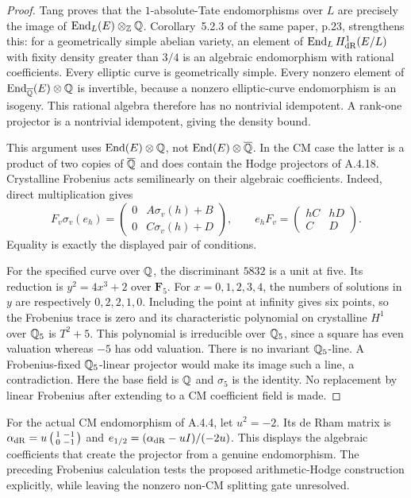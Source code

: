 \begin{proof}
Tang \cite[Definition 2.3.1 and Theorem 2.3.3, p.7]{EllTang2017} proves that the $1$-absolute-Tate endomorphisms over $L$ are precisely the image of
$\operatorname{End}_L(E)\otimes_{\mathbb Z}\mathbb Q$. Corollary~5.2.3 of the same paper, p.23, strengthens this: for a geometrically simple abelian variety, an element of $\operatorname{End}_L H^1_{\mathrm{dR}}(E/L)$ with fixity density greater than $3/4$ is an algebraic endomorphism with rational coefficients. Every elliptic curve is geometrically simple. Every nonzero element of $\operatorname{End}_{\overline{\mathbb Q}}(E)\otimes\mathbb Q$ is invertible, because a nonzero elliptic-curve endomorphism is an isogeny. This rational algebra therefore has no nontrivial idempotent. A rank-one projector is a nontrivial idempotent, giving the density bound.

This argument uses $\operatorname{End}(E)\otimes\mathbb Q$, not $\operatorname{End}(E)\otimes\overline{\mathbb Q}$. In the CM case the latter is a product of two copies of $\overline{\mathbb Q}$ and does contain the Hodge projectors of A.4.18. Crystalline Frobenius acts semilinearly on their algebraic coefficients. Indeed, direct multiplication gives
\[
 F_v\sigma_v(e_h)=
 \begin{pmatrix}0&A\sigma_v(h)+B\\0&C\sigma_v(h)+D\end{pmatrix},
 \qquad
 e_hF_v=\begin{pmatrix}hC&hD\\C&D\end{pmatrix}.
\]
Equality is exactly the displayed pair of conditions.

For the specified curve over $\mathbb Q$, the discriminant $5832$ is a unit at five. Its reduction is $y^2=4x^3+2$ over $\mathbf F_5$. For $x=0,1,2,3,4$, the numbers of solutions in $y$ are respectively $0,2,2,1,0$. Including the point at infinity gives six points, so the Frobenius trace is zero and its characteristic polynomial on crystalline $H^1$ over $\mathbb Q_5$ is $T^2+5$. This polynomial is irreducible over $\mathbb Q_5$, since a square has even valuation whereas $-5$ has odd valuation. There is no invariant $\mathbb Q_5$-line. A Frobenius-fixed $\mathbb Q_5$-linear projector would make its image such a line, a contradiction. Here the base field is $\mathbb Q$ and $\sigma_5$ is the identity. No replacement by linear Frobenius after extending to a CM coefficient field is made.
\end{proof}

For the actual CM endomorphism of A.4.4, let $u^2=-2$. Its de Rham matrix is
$\alpha_{\mathrm{dR}}=u\left(\begin{smallmatrix}1&-1\\0&-1\end{smallmatrix}\right)$ and
$e_{1/2}=(\alpha_{\mathrm{dR}}-uI)/(-2u)$. This displays the algebraic coefficients that create the projector from a genuine endomorphism. The preceding Frobenius calculation tests the proposed arithmetic-Hodge construction explicitly, while leaving the nonzero non-CM splitting gate unresolved.

